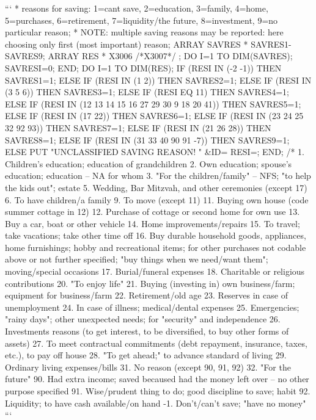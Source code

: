 ```
*   reasons for saving: 1=cant save, 2=education, 3=family, 4=home,
    5=purchases, 6=retirement, 7=liquidity/the future, 8=investment,
    9=no particular reason;
*   NOTE: multiple saving reasons may be reported: here choosing only
    first (most important) reason;
    ARRAY SAVRES {*} SAVRES1-SAVRES9;
    ARRAY RES {*} X3006 /*X3007*/ ;
    DO I=1 TO DIM(SAVRES);
      SAVRES{I}=0;
    END;
    DO I=1 TO DIM(RES);
      IF (RES{I} IN (-2 -1)) THEN SAVRES{1}=1;
      ELSE IF (RES{I} IN (1 2)) THEN SAVRES{2}=1;
      ELSE IF (RES{I} IN (3 5 6)) THEN SAVRES{3}=1;
      ELSE IF (RES{I} EQ 11) THEN SAVRES{4}=1;
      ELSE IF (RES{I} IN (12 13 14 15 16 27 29 30 9 18 20 41)) THEN
        SAVRES{5}=1;
      ELSE IF (RES{I} IN (17 22)) THEN SAVRES{6}=1;
      ELSE IF (RES{I} IN (23 24 25 32 92 93)) THEN SAVRES{7}=1;
      ELSE IF (RES{I} IN (21 26 28)) THEN SAVRES{8}=1;
      ELSE IF (RES{I} IN (31 33 40 90 91 -7)) THEN SAVRES{9}=1;
      ELSE PUT "UNCLASSIFIED SAVING REASON! " &ID= RES{I}=;
    END;
/*
    1.  Children's education; education of grandchildren
    2.  Own education; spouse's education; education -- NA for whom
    3.  "For the children/family"  -- NFS; "to help the kids
        out"; estate
    5.  Wedding, Bar Mitzvah, and other ceremonies (except 17)
    6.  To have children/a family
    9.  To move (except 11)
   11.  Buying own house (code summer cottage in 12)
   12.  Purchase of cottage or second home for own use
   13.  Buy a car, boat or other vehicle
   14.  Home improvements/repairs
   15.  To travel; take vacations; take other time off
   16.  Buy durable household goods, appliances, home
        furnishings; hobby and recreational items; for other
        purchases not codable above or not further specified;
        "buy things when we need/want them"; moving/special occasions
   17.  Burial/funeral expenses
   18.  Charitable or religious contributions
   20.  "To enjoy life"
   21.  Buying (investing in) own business/farm; equipment for
        business/farm
   22.  Retirement/old age
   23.  Reserves in case of unemployment
   24.  In case of illness; medical/dental expenses
   25.  Emergencies; "rainy days"; other unexpected needs; for
       "security" and independence
   26.  Investments reasons (to get interest, to be
        diversified, to buy other forms of assets)
   27.  To meet contractual commitments (debt repayment,
        insurance, taxes, etc.), to pay off house
   28.  "To get ahead;" to advance standard of living
   29.  Ordinary living expenses/bills
   31.  No reason (except 90, 91, 92)
   32.  "For the future"
   90.  Had extra income; saved becaused had the money left
        over -- no other purpose specified
   91.  Wise/prudent thing to do; good discipline to save; habit
   92.  Liquidity; to have cash available/on hand
   -1.  Don't/can't save; "have no money"
  ```
